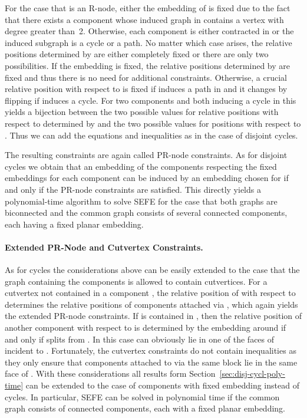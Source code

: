 \documentclass{scrartcl}
\newcommand{\1}[1]{{\normalfont \ensuremath{#1^{\tiny\circled{1}}}}} \newcommand{\2}[1]{{\normalfont \ensuremath{#1^{\tiny\circled{2}}}}} \renewcommand{\k}[1]{{\normalfont \ensuremath{#1^{\tiny\circled{k}}}}} \newcommand{\proj}[2]{\ensuremath{\left.#1\right|_{#2}}} \newcommand{\eps}{\varepsilon}
\theoremstyle{plain} \newtheorem{theorem}{Theorem} \newcounter{lemmacounter} \setcounter{lemmacounter}{0} \newtheorem{lemma}[lemmacounter]{Lemma} \newtheorem{fact}{Fact}  \newtheorem{corollary}{Corollary} \theoremstyle{definition} \newtheorem{definition}{Definition}
\begin{document}
For the case that  is an R-node, either the embedding of
 is fixed due to the fact that there exists a component
whose induced graph in  contains a vertex with degree
greater than~2.  Otherwise, each component is either contracted in
 or the induced subgraph is a cycle or a path.  No matter which
case arises, the relative positions determined by  are either
completely fixed or there are only two possibilities.  If the
embedding is fixed, the relative positions determined by  are
fixed and thus there is no need for additional constraints.
Otherwise, a crucial relative position with respect to  is fixed if
 induces a path in  and it changes by flipping
 if  induces a cycle.  For two components  and 
both inducing a cycle in  this yields a bijection between
the two possible values for relative positions with respect to 
determined by  and the two possible values for positions with
respect to .  Thus we can add the equations and inequalities as in
the case of disjoint cycles.

The resulting constraints are again called PR-node constraints.  As
for disjoint cycles we obtain that an embedding of the components
 respecting the fixed embeddings for each component can be
induced by an embedding chosen for  if and only if the PR-node
constraints are satisfied.  This directly yields a polynomial-time
algorithm to solve {\sc SEFE} for the case that both graphs are
biconnected and the common graph consists of several connected
components, each having a fixed planar embedding.

\paragraph{Extended PR-Node and Cutvertex Constraints.}
\label{sec:extended-pr-node}

As for cycles the considerations above can be easily extended to the
case that the graph  containing the components  is
allowed to contain cutvertices.  For a cutvertex  not contained in
a component , the relative position of  with respect to 
determines the relative positions of components attached via ,
which again yields the extended PR-node constraints.  If  is
contained in , then the relative position of another component 
with respect to  is determined by the embedding around  if and
only if  splits  from .  In this case  can obviously lie
in one of the faces of  incident to .  Fortunately, the
cutvertex constraints do not contain inequalities as they only ensure
that components attached to  via the same block lie in the same
face of .  With these considerations all results form
Section~\ref{sec:disj-cycl-poly-time} can be extended to the case of
components with fixed embedding instead of cycles.  In particular,
{\sc SEFE} can be solved in polynomial time if the common graph
consists of connected components, each with a fixed planar embedding.
\end{document}
